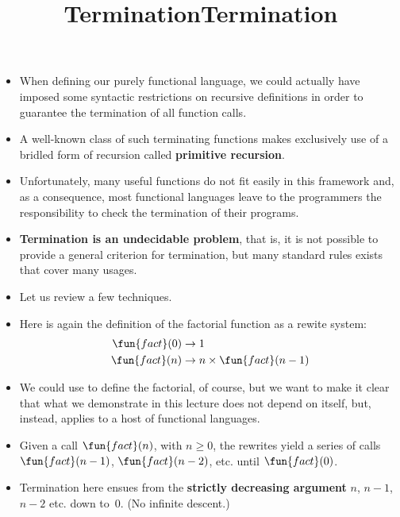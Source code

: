 \documentclass[wide]{slides}
\begin{document}
\begin{slide}
  \title{Termination}

  \begin{itemize}

    \item When defining our purely functional language, we could
      actually have imposed some syntactic restrictions on recursive
      definitions in order to guarantee the termination of all
      function calls.

    \item A well\hyp{}known class of such terminating functions makes
      exclusively use of a bridled form of recursion called
      \textbf{primitive recursion}.

    \item Unfortunately, many useful functions do not fit easily in
      this framework and, as a consequence, most functional languages
      leave to the programmers the responsibility to check the
      termination of their programs.

    \item \textbf{Termination is an undecidable problem}, that is, it
      is not possible to provide a general criterion for termination,
      but many standard rules exists that cover many usages.

    \item Let us review a few techniques.

  \end{itemize}

\end{slide}

\begin{slide}
  \title{Termination}

  \begin{itemize}

    \item Here is again the definition of the factorial function as a
      rewite system:
      \begin{align*}
        \fun{fact}(0) & \rightarrow 1\\
        \fun{fact}(n) & \rightarrow n \times \fun{fact}(n-1)
      \end{align*}

    \item We could use \OCaml to define the factorial, of course, but
      we want to make it clear that what we demonstrate in this
      lecture does not depend on \OCaml itself, but, instead, applies
      to a host of functional languages.

    \item Given a call \(\fun{fact}(n)\), with \(n \geqslant 0\), the
      rewrites yield a series of calls \(\fun{fact}(n-1)\),
      \(\fun{fact}(n-2)\), etc. until \(\fun{fact}(0)\).

    \item Termination here ensues from the \textbf{strictly decreasing
      argument} \(n\), \(n-1\), \(n-2\) etc. down to~\(0\). (No
      infinite descent.)

  \end{itemize}

\end{slide}
\end{document}
